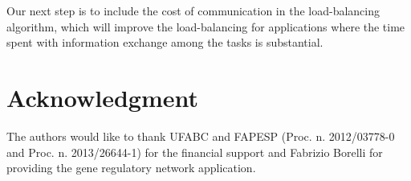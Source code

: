 \documentclass[journal]{IEEEtran}
\begin{document}
Our next step is to include the cost of communication in the load-balancing
algorithm, which will improve the load-balancing for applications where the time
spent with information exchange among the tasks is substantial.

\section*{Acknowledgment}

The authors would like to thank UFABC and FAPESP (Proc. n. 2012/03778-0 and
Proc. n.  2013/26644-1) for the financial support and Fabrizio Borelli for
providing the gene regulatory network application.

\ifCLASSOPTIONcaptionsoff
  \newpage
\fi



%
%

\end{document}
